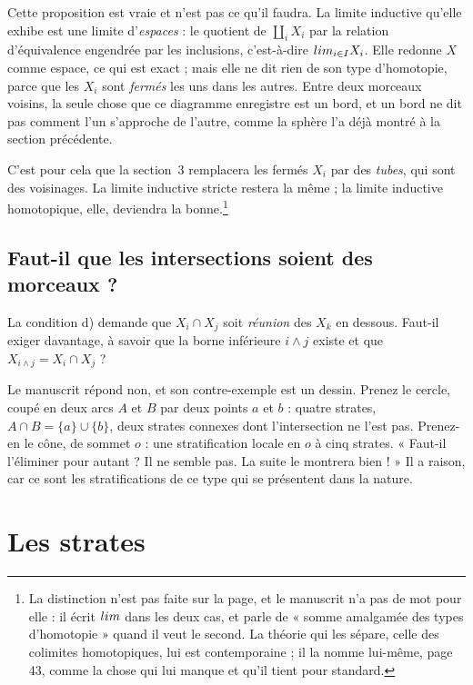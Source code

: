 \documentclass[11pt,a4paper]{article}
\begin{document}
Cette proposition est vraie et n'est pas ce qu'il faudra. La limite inductive
qu'elle exhibe est une limite d'\emph{espaces} : le quotient de
$\coprod_{i} X_{i}$ par la relation d'équivalence engendrée par les inclusions,
c'est-à-dire $\varinjlim_{i \in I} X_{i}$. Elle redonne $X$ comme espace, ce qui
est exact ; mais elle ne dit rien de son type d'homotopie, parce que les
$X_{i}$ sont \emph{fermés} les uns dans les autres. Entre deux morceaux voisins,
la seule chose que ce diagramme enregistre est un bord, et un bord ne dit pas
comment l'un s'approche de l'autre, comme la sphère l'a déjà montré à la section
précédente.

C'est pour cela que la section~3 remplacera les fermés $X_{i}$ par
des \emph{tubes}, qui sont des voisinages. La limite inductive stricte restera
la même ; la limite inductive homotopique, elle, deviendra la bonne.\footnote{La
distinction n'est pas faite sur la page, et le manuscrit n'a pas de mot pour
elle : il écrit $\varinjlim$ dans les deux cas, et parle de « somme amalgamée des
types d'homotopie » quand il veut le second. La théorie qui les sépare, celle des
colimites homotopiques, lui est contemporaine ; il la nomme lui-même, page 43,
comme la chose qui lui manque et qu'il tient pour standard.}

\subsection*{Faut-il que les intersections soient des morceaux ?}

La condition d) demande que $X_{i} \cap X_{j}$ soit \emph{réunion} des $X_{k}$
en dessous. Faut-il exiger davantage, à savoir que la borne inférieure $i \wedge j$
existe et que $X_{i \wedge j} = X_{i} \cap X_{j}$ ?

Le manuscrit répond non, et son contre-exemple est un dessin. Prenez le cercle,
coupé en deux arcs $A$ et $B$ par deux points $a$ et $b$ : quatre strates,
$A \cap B = \{a\} \cup \{b\}$, deux strates connexes dont l'intersection ne l'est
pas. Prenez-en le cône, de sommet $o$ : une stratification locale en $o$ à cinq
strates. « Faut-il l'éliminer pour autant ? Il ne semble pas. La suite le
montrera bien ! » Il a raison, car ce sont les stratifications
de ce type qui se présentent dans la nature.

\section*{Les strates}
\end{document}
